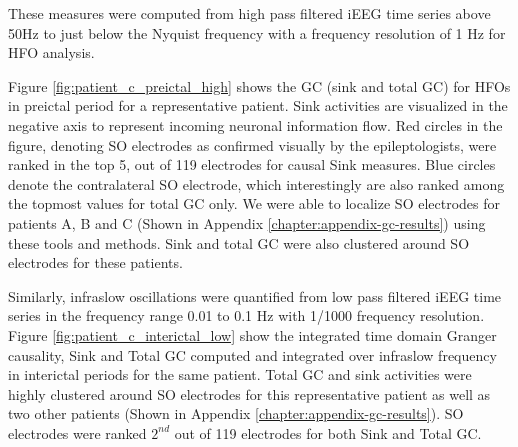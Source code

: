 These measures were computed from high pass filtered iEEG time series above 50Hz to just below the Nyquist frequency with a frequency resolution of 1 Hz for HFO analysis. 

Figure \ref{fig:patient_c_preictal_high} shows the GC (sink and total GC) for HFOs in preictal period for a representative patient. Sink activities are visualized in the negative axis to represent incoming neuronal information flow. Red circles in the figure, denoting SO electrodes as confirmed visually by the epileptologists, were ranked in the top 5, out of 119 electrodes for causal Sink measures. Blue circles denote the contralateral SO electrode, which interestingly are also ranked among the topmost values for total GC only. We were able to localize SO electrodes for patients A, B and C (Shown in Appendix \ref{chapter:appendix-gc-results}) using these tools and methods. Sink and total GC were also clustered around SO electrodes for these patients. 

Similarly, infraslow oscillations were quantified from low pass filtered iEEG time series in the frequency range 0.01 to 0.1 Hz with 1/1000 frequency resolution. Figure \ref{fig:patient_c_interictal_low} show the integrated time domain Granger causality, Sink and Total GC computed and integrated over infraslow frequency in interictal periods for the same patient. Total GC and sink activities were highly clustered around SO electrodes for this representative patient as well as two other patients (Shown in Appendix \ref{chapter:appendix-gc-results}). SO electrodes were ranked $2^{nd}$ out of 119 electrodes for both Sink and Total GC.







